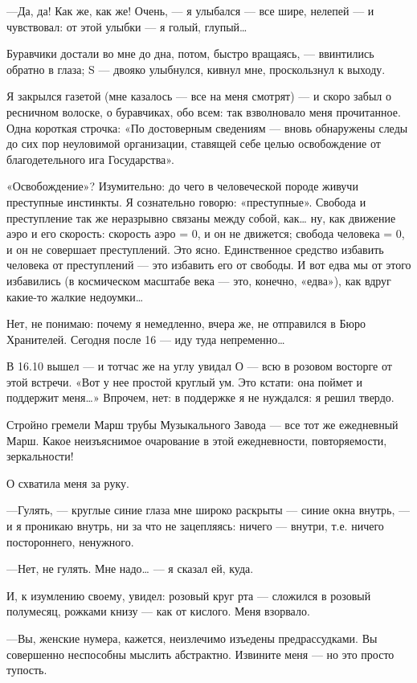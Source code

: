 \documentclass[11pt,openany]{book}
\begin{document}
---Да, да! Как же, как же! Очень, --- я улыбался --- все шире, нелепей --- и чувствовал: от этой улыбки --- я голый, глупый\ldots{}

Буравчики достали во мне до дна, потом, быстро вращаясь, --- ввинтились обратно в глаза; S --- двояко улыбнулся, кивнул мне, проскользнул к выходу.

Я закрылся газетой (мне казалось --- все на меня смотрят) --- и скоро забыл о ресничном волоске, о буравчиках, обо всем: так взволновало меня прочитанное. Одна короткая строчка: «По достоверным сведениям --- вновь обнаружены следы до сих пор неуловимой организации, ставящей себе целью освобождение от благодетельного ига Государства».

«Освобождение»? Изумительно: до чего в человеческой породе живучи преступные инстинкты. Я сознательно говорю: «преступные». Свобода и преступление так же неразрывно связаны между собой, как\ldots{} ну, как движение аэро и его скорость: скорость аэро = 0, и он не движется; свобода человека = 0, и он не совершает преступлений. Это ясно. Единственное средство избавить человека от преступлений --- это избавить его от свободы. И вот едва мы от этого избавились (в космическом масштабе века --- это, конечно, «едва»), как вдруг какие-то жалкие недоумки\ldots{}

Нет, не понимаю: почему я немедленно, вчера же, не отправился в Бюро Хранителей. Сегодня после 16 --- иду туда непременно\ldots{}

В 16.10 вышел --- и тотчас же на углу увидал О --- всю в розовом восторге от этой встречи. «Вот у нее простой круглый ум. Это кстати: она поймет и поддержит меня\ldots{}» Впрочем, нет: в поддержке я не нуждался: я решил твердо.

Стройно гремели Марш трубы Музыкального Завода --- все тот же ежедневный Марш. Какое неизъяснимое очарование в этой ежедневности, повторяемости, зеркальности!

О схватила меня за руку.

---Гулять, --- круглые синие глаза мне широко раскрыты --- синие окна внутрь, --- и я проникаю внутрь, ни за что не зацепляясь: ничего --- внутри, т.е. ничего постороннего, ненужного.

---Нет, не гулять. Мне надо\ldots{} --- я сказал ей, куда.

И, к изумлению своему, увидел: розовый круг рта --- сложился в розовый полумесяц, рожками книзу --- как от кислого. Меня взорвало.

---Вы, женские нумера, кажется, неизлечимо изъедены предрассудками. Вы совершенно неспособны мыслить абстрактно. Извините меня --- но это просто тупость.
\end{document}
